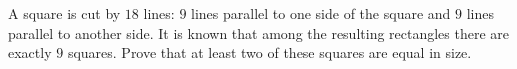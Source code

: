 A square is cut by $18$ lines: $9$ lines parallel to one side of the square and $9$ lines parallel to another side. It is known that among the resulting rectangles there are exactly $9$ squares. Prove that at least two of these squares are equal in size.
